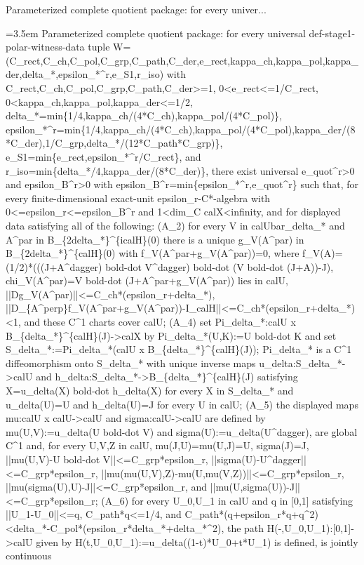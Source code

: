\documentclass{article}
\newcommand{\step}[1]{\par\noindent\hangindent=3.5em\hangafter=1%
  \makebox[3.5em][l]{\textbf{#1.}}}
\begin{document}
\begin{proofbox}{Parameterized complete quotient package: for every univer...}
\step{1} Parameterized complete quotient package: for every universal def-stage1-polar-witness-data tuple W=(C\_rect,C\_ch,C\_pol,C\_grp,C\_path,C\_der,e\_rect,kappa\_ch,kappa\_pol,kappa\_der,delta\_*,epsilon\_*\textasciicircum{}r,e\_S1,r\_iso) with C\_rect,C\_ch,C\_pol,C\_grp,C\_path,C\_der>=1, 0<e\_rect<=1/C\_rect, 0<kappa\_ch,kappa\_pol,kappa\_der<=1/2, delta\_*=min\{1/4,kappa\_ch/(4*C\_ch),kappa\_pol/(4*C\_pol)\}, epsilon\_*\textasciicircum{}r=min\{1/4,kappa\_ch/(4*C\_ch),kappa\_pol/(4*C\_pol),kappa\_der/(8*C\_der),1/C\_grp,delta\_*/(12*C\_path*C\_grp)\}, e\_S1=min\{e\_rect,epsilon\_*\textasciicircum{}r/C\_rect\}, and r\_iso=min\{delta\_*/4,kappa\_der/(8*C\_der)\}, there exist universal e\_quot\textasciicircum{}r>0 and epsilon\_B\textasciicircum{}r>0 with epsilon\_B\textasciicircum{}r=min\{epsilon\_*\textasciicircum{}r,e\_quot\textasciicircum{}r\} such that, for every finite-dimensional exact-unit epsilon\_r-C*-algebra with 0<=epsilon\_r<=epsilon\_B\textasciicircum{}r and 1<dim\_C calX<infinity, and for displayed data satisfying all of the following: (A\_2) for every V in calUbar\_delta\_* and A\textasciicircum{}par in B\_\{2delta\_*\}\textasciicircum{}\{icalH\}(0) there is a unique g\_V(A\textasciicircum{}par) in B\_\{2delta\_*\}\textasciicircum{}\{calH\}(0) with f\_V(A\textasciicircum{}par+g\_V(A\textasciicircum{}par))=0, where f\_V(A)=(1/2)*(((J+A\textasciicircum{}dagger) bold-dot V\textasciicircum{}dagger) bold-dot (V bold-dot (J+A))-J), chi\_V(A\textasciicircum{}par)=V bold-dot (J+A\textasciicircum{}par+g\_V(A\textasciicircum{}par)) lies in calU, ||Dg\_V(A\textasciicircum{}par)||<=C\_ch*(epsilon\_r+delta\_*), ||D\_\{A\textasciicircum{}perp\}f\_V(A\textasciicircum{}par+g\_V(A\textasciicircum{}par))-I\_calH||<=C\_ch*(epsilon\_r+delta\_*)<1, and these C\textasciicircum{}1 charts cover calU; (A\_4) set Pi\_delta\_*:calU x B\_\{delta\_*\}\textasciicircum{}\{calH\}(J)->calX by Pi\_delta\_*(U,K):=U bold-dot K and set S\_delta\_*:=Pi\_delta\_*(calU x B\_\{delta\_*\}\textasciicircum{}\{calH\}(J)); Pi\_delta\_* is a C\textasciicircum{}1 diffeomorphism onto S\_delta\_* with unique inverse maps u\_delta:S\_delta\_*->calU and h\_delta:S\_delta\_*->B\_\{delta\_*\}\textasciicircum{}\{calH\}(J) satisfying X=u\_delta(X) bold-dot h\_delta(X) for every X in S\_delta\_* and u\_delta(U)=U and h\_delta(U)=J for every U in calU; (A\_5) the displayed maps mu:calU x calU->calU and sigma:calU->calU are defined by mu(U,V):=u\_delta(U bold-dot V) and sigma(U):=u\_delta(U\textasciicircum{}dagger), are global C\textasciicircum{}1 and, for every U,V,Z in calU, mu(J,U)=mu(U,J)=U, sigma(J)=J, ||mu(U,V)-U bold-dot V||<=C\_grp*epsilon\_r, ||sigma(U)-U\textasciicircum{}dagger||<=C\_grp*epsilon\_r, ||mu(mu(U,V),Z)-mu(U,mu(V,Z))||<=C\_grp*epsilon\_r, ||mu(sigma(U),U)-J||<=C\_grp*epsilon\_r, and ||mu(U,sigma(U))-J||<=C\_grp*epsilon\_r; (A\_6) for every U\_0,U\_1 in calU and q in [0,1] satisfying ||U\_1-U\_0||<=q, C\_path*q<=1/4, and C\_path*(q+epsilon\_r*q+q\textasciicircum{}2)<delta\_*-C\_pol*(epsilon\_r*delta\_*+delta\_*\textasciicircum{}2), the path H(-,U\_0,U\_1):[0,1]->calU given by H(t,U\_0,U\_1):=u\_delta((1-t)*U\_0+t*U\_1) is defined, is jointly continuous 
\end{proofbox}
\end{document}
